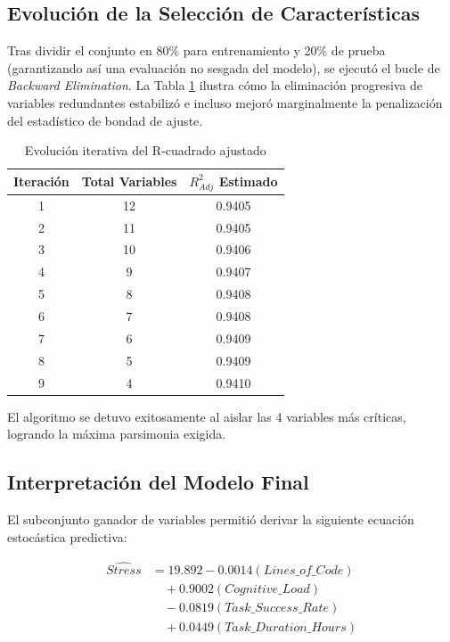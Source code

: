 \documentclass[procedia]{easychair}
\begin{document}
\subsection{Evolución de la Selección de Características}
Tras dividir el conjunto en 80\% para entrenamiento y 20\% de prueba (garantizando así una evaluación no sesgada del modelo), se ejecutó el bucle de \textit{Backward Elimination}. La Tabla \ref{tab:modelos} ilustra cómo la eliminación progresiva de variables redundantes estabilizó e incluso mejoró marginalmente la penalización del estadístico de bondad de ajuste.

\begin{table}[H]
\centering
\caption{Evolución iterativa del R-cuadrado ajustado}
\label{tab:modelos}
\begin{tabular}{ccc}
\toprule
Iteración & Total Variables & $R^2_{Adj}$ Estimado \\
\midrule
1 & 12 & 0.9405 \\
2 & 11 & 0.9405 \\
3 & 10 & 0.9406 \\
4 & 9 & 0.9407 \\
5 & 8 & 0.9408 \\
6 & 7 & 0.9408 \\
7 & 6 & 0.9409 \\
8 & 5 & 0.9409 \\
9 & 4 & 0.9410 \\
\bottomrule
\end{tabular}
\end{table}

El algoritmo se detuvo exitosamente al aislar las 4 variables más críticas, logrando la máxima parsimonia exigida.

\subsection{Interpretación del Modelo Final}
El subconjunto ganador de variables permitió derivar la siguiente ecuación estocástica predictiva:

\begin{equation}
\begin{aligned}
\widehat{Stress} &= 19.892 - 0.0014(Lines\_of\_Code) \\
&\quad + 0.9002(Cognitive\_Load) \\
&\quad - 0.0819(Task\_Success\_Rate) \\
&\quad + 0.0449(Task\_Duration\_Hours)
\end{aligned}
\end{equation}
\end{document}
